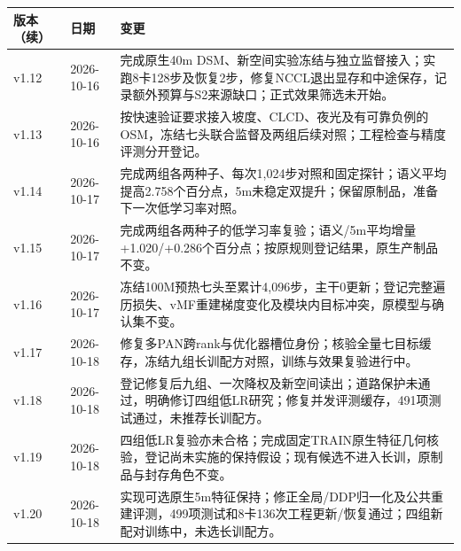 \documentclass[UTF8,fontset=fandol,zihao=5,a4paper]{ctexart}
\newcommand{\reportpage}{\clearpage}
\begin{document}
\noindent\begin{tabularx}{\linewidth}{@{}p{2cm}p{2.8cm}Y@{}}
\toprule 版本（续） & 日期 & 变更\\\midrule
v1.12 & 2026-10-16 & 完成原生40m DSM、新空间实验冻结与独立监督接入；实跑8卡128步及恢复2步，修复NCCL退出显存和中途保存，记录额外预算与S2来源缺口；正式效果筛选未开始。\\
v1.13 & 2026-10-16 & 按快速验证要求接入坡度、CLCD、夜光及有可靠负例的OSM，冻结七头联合监督及两组后续对照；工程检查与精度评测分开登记。\\
v1.14 & 2026-10-17 & 完成两组各两种子、每次1{,}024步对照和固定探针；语义平均提高2.758个百分点，5m未稳定双提升；保留原制品，准备下一次低学习率对照。\\
v1.15 & 2026-10-17 & 完成两组各两种子的低学习率复验；语义/5m平均增量+1.020/+0.286个百分点；按原规则登记结果，原生产制品不变。\\
v1.16 & 2026-10-17 & 冻结100M预热七头至累计4{,}096步，主干0更新；登记完整遍历损失、vMF重建梯度变化及模块内目标冲突，原模型与确认集不变。\\
v1.17 & 2026-10-18 & 修复多PAN跨rank与优化器槽位身份；核验全量七目标缓存，冻结九组长训配方对照，训练与效果复验进行中。\\
v1.18 & 2026-10-18 & 登记修复后九组、一次降权及新空间读出；道路保护未通过，明确修订四组低LR研究；修复并发评测缓存，491项测试通过，未推荐长训配方。\\
v1.19 & 2026-10-18 & 四组低LR复验亦未合格；完成固定TRAIN原生特征几何核验，登记尚未实施的保持假设；现有候选不进入长训，原制品与封存角色不变。\\
v1.20 & 2026-10-18 & 实现可选原生5m特征保持；修正全局/DDP归一化及公共重建评测，499项测试和8卡136次工程更新/恢复通过；四组新配对训练中，未选长训配方。\\
\bottomrule\end{tabularx}
\reportpage
\end{document}
